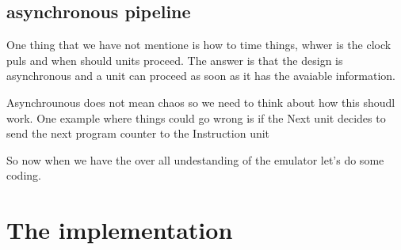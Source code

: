 \documentclass[a4paper,11pt]{article}
\begin{document}
\subsection{asynchronous pipeline}

One thing that we have not mentione is how to time things, whwer is
the clock puls and when should units proceed. The answer is that the
design is asynchronous and a unit can proceed as soon as it has the
avaiable information.

Asynchrounous does not mean chaos so we need to think about how this
shoudl work. One example where things could go wrong is if the Next
unit decides to send the next program counter to the Instruction unit 





So now when we have the over all undestanding of the emulator let's do
some coding.



\section{The implementation}
\end{document}
